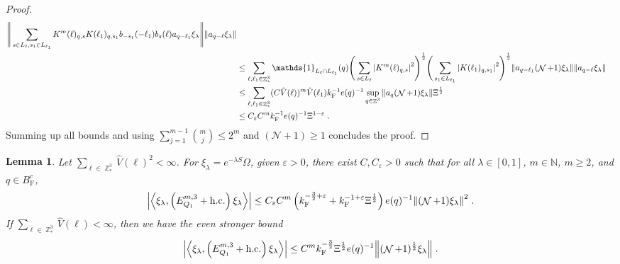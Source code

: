 \documentclass[12pt,a4paper]{article}
\numberwithin{equation}{section}
\newcommand{\cN}{\mathcal{N}}
\newcommand{\NNN}{\mathbb{N}}
\newcommand{\1}{\mathbb{I}}
\newcommand{\F}{\mathrm{F}}
\DeclareMathOperator{\Z}{\mathbb{Z}}
\DeclareMathOperator{\NN}{\mathcal{N}}
\newcommand{\half}{\frac{1}{2}}
\newcommand{\eva}[1]{\left\langle #1 \right\rangle}
\theoremstyle{plain}
\newtheorem{lemma}[theorem]{Lemma}
\theoremstyle{definition}
\theoremstyle{remark}
\theoremstyle{plain}
\theoremstyle{definition}
\theoremstyle{remark}
\begin{document}
\begin{proof}
{\begin{align}
		\Bigg\Vert \sum\limits_{s\in L_{\ell}, s_1 \in L_{\ell_1}} K^m(\ell)_{q,s}K(\ell_1)_{q,s_1} b_{-s_1}(-\ell_1) b_{s}(\ell) a_{q-\ell_1}\xi_\lambda \Bigg\Vert
		\norm{ a_{q-\ell}\xi_\lambda }\nonumber\\
	&\leq \sum_{\ell,\ell_1 \in \Z^3_*} \mathds{1}_{L_\ell \cap L_{\ell_1}}(q)
		\Bigg(\sum\limits_{s \in L_{\ell}} \abs{K^m(\ell)_{q,s}}^2\Bigg)^\half \Bigg(\sum\limits_{s_1 \in L_{\ell_1}} \abs{K(\ell_1)_{q,s_1}}^2\Bigg)^\half \norm{ a_{q-\ell_1} (\NN+1)\xi_\lambda} \norm{ a_{q-\ell}\xi_\lambda }\nonumber\\
	&\leq \sum_{\ell,\ell_1 \in \Z^3_*} (C \hat{V}(\ell))^m \hat{V}(\ell_1) k_{\F}^{-1} e(q)^{-1} \sup_{q \in \Z^3}\norm{ a_{q} (\NN+1) \xi_\lambda}\Xi^\half\nonumber\\
	&\leq C_\varepsilon C^m k_{\F}^{-1} e(q)^{-1} \Xi^{1-\varepsilon} \;. \label{eq:estEQ1113}
\end{align}
}
Summing up all bounds and using $\sum_{j=1}^{m-1} {{m}\choose j} \le 2^m $ and $ (\cN+1) \ge 1 $ concludes the proof.
\end{proof}



\begin{lemma} \label{lem:EQ112}
Let $ \sum_{\ell \in \Z^3_*} \hat{V}(\ell)^2 < \infty $. For $\xi_\lambda = e^{-\lambda S} \Omega$, given $ \varepsilon > 0 $, there exist $ C, C_\varepsilon > 0 $ such that for all $ \lambda \in [0,1] $, $ m \in \NNN $, $ m \ge 2 $, and $ q \in B_{\F}^c $,
\begin{equation} \label{eq:estEQ112_Coulomb}
\begin{aligned}
	\abs{\eva{\xi_\lambda,\left(E^{m,3}_{Q_1}+\mathrm{h.c.}\right) \xi_\lambda }}\nonumber
	\leq C_\varepsilon C^m \left( k_{\F}^{-\frac 32 + \varepsilon}
		+ k_{\F}^{-1 + \varepsilon} \Xi^\half \right)
		e(q)^{-1}
		\norm{(\NN+1) \xi_\lambda }^2 \;.
\end{aligned}
\end{equation}
If $ \sum_{\ell \in \Z^3_*} \hat{V}(\ell) < \infty $, then we have the even stronger bound
\begin{equation} \label{eq:estEQ112}
\begin{aligned}
	\abs{\eva{\xi_\lambda,\left(E^{m,3}_{Q_1}+\mathrm{h.c.}\right) \xi_\lambda }}\nonumber
	\leq C^m k_{\F}^{-\frac{3}{2}} \Xi^{\half} e(q)^{-1}
		\norm{(\NN+1)^\half \xi_\lambda } \;.
\end{aligned}
\end{equation}
\end{lemma}
\end{document}
